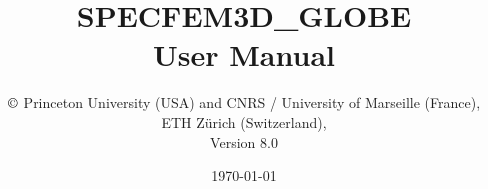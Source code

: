 \documentclass[oneside,english]{book}
\begin{document}

\thispagestyle{empty}
\begin{center}
\vspace*{-1.8truecm}
\noindent{}
\end{center}
%
\title{\thispagestyle{empty}\textbf{SPECFEM3D\_GLOBE}\\
\textbf{User Manual}}
%
\author{$\copyright$ Princeton University (USA) and CNRS / University of Marseille (France),\\
ETH Z\"urich (Switzerland),\\
Version 8.0
}

\date{\today}

\maketitle
\end{document}
